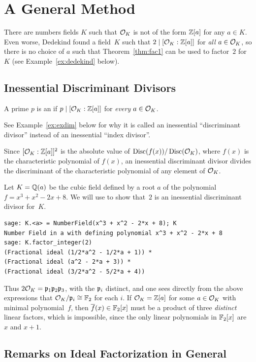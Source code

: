 \section{A General Method}
There are numbers fields $K$ such that $\mathcal{O}_K$ is not of the form
$\mathbb{Z}[a]$ for any $a\in K$.  Even worse, Dedekind found a
field~$K$ such that $2\mid [\mathcal{O}_K : \mathbb{Z}[a]]$ for {\em all}
$a\in \mathcal{O}_K$, so there is no choice of $a$ such that
Theorem~\ref{thm:fac1} can be used to factor~$2$ for $K$ (see
Example~\ref{ex:dedekind} below).

\subsection{Inessential Discriminant Divisors}
\begin{definition}
A prime $p$ is an  if $p\mid [\mathcal{O}_K : \mathbb{Z}[a]]$ for 
{\em every} $a\in\mathcal{O}_K$.  
\end{definition}
See Example~\ref{ex:exdim} below for
why it is called an inessential ``discriminant divisor'' instead
of an inessential ``index divisor''.

Since $[\mathcal{O}_K : \mathbb{Z}[a]]^2$ is the absolute value of
$\operatorname{Disc}(f(x))/\operatorname{Disc}(\mathcal{O}_K)$, where $f(x)$ is the characteristic
polynomial of $f(x)$, an inessential discriminant divisor divides the
discriminant of the characteristic polynomial of any element of
$\mathcal{O}_K$.

\begin{example}[Dedekind]\label{ex:dedekind}
Let $K=\mathbb{Q}(a)$ be the cubic field defined by a root $a$ of the polynomial
$f = x^3 + x^2 - 2x+8$.  We will use \sage to show that~$2$ is an inessential
discriminant divisor for~$K$.  
\begin{verbatim}
sage: K.<a> = NumberField(x^3 + x^2 - 2*x + 8); K
Number Field in a with defining polynomial x^3 + x^2 - 2*x + 8
sage: K.factor_integer(2)
(Fractional ideal (1/2*a^2 - 1/2*a + 1)) * 
(Fractional ideal (a^2 - 2*a + 3)) * 
(Fractional ideal (3/2*a^2 - 5/2*a + 4))
\end{verbatim}
Thus $2\mathcal{O}_K=\mathfrak{p}_1\mathfrak{p}_2\mathfrak{p}_3$, with the $\mathfrak{p}_i$ distinct,
and one sees directly from the above expressions
that 
$\mathcal{O}_K/\mathfrak{p}_i\cong \mathbb{F}_2$ for each $i$.  If $\mathcal{O}_K=\mathbb{Z}[a]$
for some $a\in\mathcal{O}_K$ with minimal polynomial~$f$, then 
$\overline{f}(x)\in\mathbb{F}_2[x]$ must be a product of three {\em distinct} 
linear factors, which is impossible, since the only
linear polynomials in $\mathbb{F}_2[x]$ are $x$ and $x+1$.
\end{example}

\subsection{Remarks on Ideal Factorization in General}

